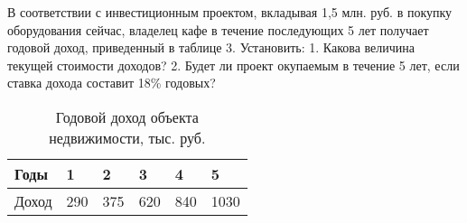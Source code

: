 В соответствии с инвестиционным проектом, вкладывая 1,5 млн. руб. в покупку оборудования сейчас, владелец кафе в течение последующих 5 лет получает годовой доход, приведенный в таблице 3.
Установить:
1. Какова величина текущей стоимости доходов?
2. Будет ли проект окупаемым в течение 5 лет, если ставка дохода составит 18\% годовых?

\begin{table}
	\small
	\centering
	\caption{Годовой доход объекта недвижимости, тыс. руб.}
	\begin{tabularx}{\textwidth}{|p{2.36cm}|K{2.3cm}|K{2.3cm}|K{2.3cm}|K{2.3cm}|K{2.3cm}|}
		\hline
		Годы&1&2&3&4&5 \\ \hline
		Доход&290&375&620&840&1030 \\ \hline
	\end{tabularx}
\end{table}








